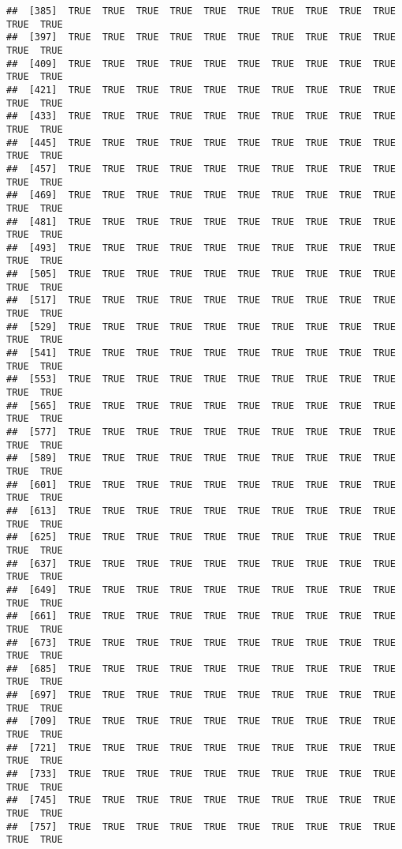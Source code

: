 \documentclass[
]{article}
\begin{document}
\begin{verbatim}
##  [385]  TRUE  TRUE  TRUE  TRUE  TRUE  TRUE  TRUE  TRUE  TRUE  TRUE  TRUE  TRUE
##  [397]  TRUE  TRUE  TRUE  TRUE  TRUE  TRUE  TRUE  TRUE  TRUE  TRUE  TRUE  TRUE
##  [409]  TRUE  TRUE  TRUE  TRUE  TRUE  TRUE  TRUE  TRUE  TRUE  TRUE  TRUE  TRUE
##  [421]  TRUE  TRUE  TRUE  TRUE  TRUE  TRUE  TRUE  TRUE  TRUE  TRUE  TRUE  TRUE
##  [433]  TRUE  TRUE  TRUE  TRUE  TRUE  TRUE  TRUE  TRUE  TRUE  TRUE  TRUE  TRUE
##  [445]  TRUE  TRUE  TRUE  TRUE  TRUE  TRUE  TRUE  TRUE  TRUE  TRUE  TRUE  TRUE
##  [457]  TRUE  TRUE  TRUE  TRUE  TRUE  TRUE  TRUE  TRUE  TRUE  TRUE  TRUE  TRUE
##  [469]  TRUE  TRUE  TRUE  TRUE  TRUE  TRUE  TRUE  TRUE  TRUE  TRUE  TRUE  TRUE
##  [481]  TRUE  TRUE  TRUE  TRUE  TRUE  TRUE  TRUE  TRUE  TRUE  TRUE  TRUE  TRUE
##  [493]  TRUE  TRUE  TRUE  TRUE  TRUE  TRUE  TRUE  TRUE  TRUE  TRUE  TRUE  TRUE
##  [505]  TRUE  TRUE  TRUE  TRUE  TRUE  TRUE  TRUE  TRUE  TRUE  TRUE  TRUE  TRUE
##  [517]  TRUE  TRUE  TRUE  TRUE  TRUE  TRUE  TRUE  TRUE  TRUE  TRUE  TRUE  TRUE
##  [529]  TRUE  TRUE  TRUE  TRUE  TRUE  TRUE  TRUE  TRUE  TRUE  TRUE  TRUE  TRUE
##  [541]  TRUE  TRUE  TRUE  TRUE  TRUE  TRUE  TRUE  TRUE  TRUE  TRUE  TRUE  TRUE
##  [553]  TRUE  TRUE  TRUE  TRUE  TRUE  TRUE  TRUE  TRUE  TRUE  TRUE  TRUE  TRUE
##  [565]  TRUE  TRUE  TRUE  TRUE  TRUE  TRUE  TRUE  TRUE  TRUE  TRUE  TRUE  TRUE
##  [577]  TRUE  TRUE  TRUE  TRUE  TRUE  TRUE  TRUE  TRUE  TRUE  TRUE  TRUE  TRUE
##  [589]  TRUE  TRUE  TRUE  TRUE  TRUE  TRUE  TRUE  TRUE  TRUE  TRUE  TRUE  TRUE
##  [601]  TRUE  TRUE  TRUE  TRUE  TRUE  TRUE  TRUE  TRUE  TRUE  TRUE  TRUE  TRUE
##  [613]  TRUE  TRUE  TRUE  TRUE  TRUE  TRUE  TRUE  TRUE  TRUE  TRUE  TRUE  TRUE
##  [625]  TRUE  TRUE  TRUE  TRUE  TRUE  TRUE  TRUE  TRUE  TRUE  TRUE  TRUE  TRUE
##  [637]  TRUE  TRUE  TRUE  TRUE  TRUE  TRUE  TRUE  TRUE  TRUE  TRUE  TRUE  TRUE
##  [649]  TRUE  TRUE  TRUE  TRUE  TRUE  TRUE  TRUE  TRUE  TRUE  TRUE  TRUE  TRUE
##  [661]  TRUE  TRUE  TRUE  TRUE  TRUE  TRUE  TRUE  TRUE  TRUE  TRUE  TRUE  TRUE
##  [673]  TRUE  TRUE  TRUE  TRUE  TRUE  TRUE  TRUE  TRUE  TRUE  TRUE  TRUE  TRUE
##  [685]  TRUE  TRUE  TRUE  TRUE  TRUE  TRUE  TRUE  TRUE  TRUE  TRUE  TRUE  TRUE
##  [697]  TRUE  TRUE  TRUE  TRUE  TRUE  TRUE  TRUE  TRUE  TRUE  TRUE  TRUE  TRUE
##  [709]  TRUE  TRUE  TRUE  TRUE  TRUE  TRUE  TRUE  TRUE  TRUE  TRUE  TRUE  TRUE
##  [721]  TRUE  TRUE  TRUE  TRUE  TRUE  TRUE  TRUE  TRUE  TRUE  TRUE  TRUE  TRUE
##  [733]  TRUE  TRUE  TRUE  TRUE  TRUE  TRUE  TRUE  TRUE  TRUE  TRUE  TRUE  TRUE
##  [745]  TRUE  TRUE  TRUE  TRUE  TRUE  TRUE  TRUE  TRUE  TRUE  TRUE  TRUE  TRUE
##  [757]  TRUE  TRUE  TRUE  TRUE  TRUE  TRUE  TRUE  TRUE  TRUE  TRUE  TRUE  TRUE

\end{verbatim}
\end{document}
